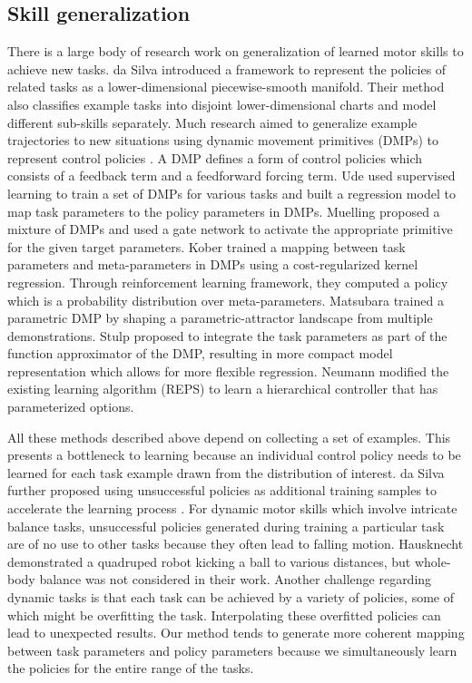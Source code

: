 \subsection{Skill generalization}
There is a large body of research work on generalization of learned
motor skills to achieve new tasks. da Silva \etal
\cite{DaSilva:2012:LPS,DaSilva:2014:LPM,DaSilva:2014:ACP} introduced a
framework to represent the policies of related tasks as a
lower-dimensional piecewise-smooth manifold. Their method also
classifies example tasks into disjoint lower-dimensional charts and
model different sub-skills separately. Much research aimed to
generalize example trajectories to new situations using dynamic
movement primitives (DMPs) to represent control policies
\cite{Ijspeert:2002:LAL}. A DMP defines a form of control policies
which consists of a feedback term and a feedforward forcing
term. Ude \etal \cite{Ude:2010:TSG} used supervised learning to train a set of
DMPs for various tasks and built a regression model to map task
parameters to the policy parameters in DMPs. 
Muelling \etal \cite{Muelling:2010:LTT}
proposed a mixture of DMPs and used a gate network to activate the
appropriate primitive for the given target parameters.
Kober \etal \cite{Kober:2010:RLA} trained a mapping between task parameters and
meta-parameters in DMPs using a cost-regularized kernel
regression. Through reinforcement learning framework, they computed a
policy which is a probability distribution over meta-parameters.
Matsubara \etal \cite{Matsubara:2011:LPD} trained a parametric DMP by shaping a
parametric-attractor landscape from multiple demonstrations.
Stulp \etal \cite{Stulp:2013:LCP} proposed to integrate the task parameters as
part of the function approximator of the DMP, resulting in more
compact model representation which allows for more flexible
regression. 
Neumann \etal \cite{Neumann:2013:IMS} modified the existing learning
algorithm (REPS) to learn a hierarchical controller that has
parameterized options.

All these methods described above depend on collecting a set of
examples. This presents a bottleneck to learning because an individual
control policy needs to be learned for each task example drawn from
the distribution of interest. da Silva \etal further proposed using
unsuccessful policies as additional training samples to accelerate the
learning process \cite{DaSilva:2014:LPM}. For dynamic motor skills
which involve intricate balance tasks, unsuccessful policies generated
during training a particular task are of no use to other tasks because
they often lead to falling motion. 
Hausknecht \etal \cite{Hausknecht:2010:LPK}
demonstrated a quadruped robot kicking a ball to various distances,
but whole-body balance was not considered in their work.  Another
challenge regarding dynamic tasks is that each task can be achieved by
a variety of policies, some of which might be overfitting the
task. Interpolating these overfitted policies can lead to unexpected
results. Our method tends to generate more coherent mapping between
task parameters and policy parameters because we simultaneously learn
the policies for the entire range of the tasks.

